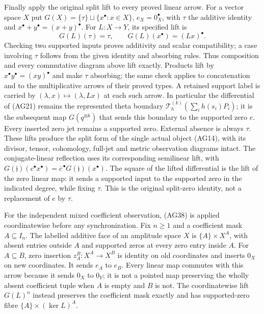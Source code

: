 Finally apply the original split lift to every proved linear arrow.
For a vector space $X$ put
$G(X)=\{\tau\}\sqcup\{x^\bullet:x\in X\}$,
$e_X=0_X^\bullet$, with $\tau$ the additive identity and
$x^\bullet+y^\bullet=(x+y)^\bullet$.
For $L:X\to Y$, its specified lift is
\[
 G(L)(\tau)=\tau,\qquad G(L)(x^\bullet)=(Lx)^\bullet.
 \tag{AG38}
\]
Checking two supported inputs proves additivity and scalar
compatibility; a case involving $\tau$ follows from the given
identity and absorbing rules.  Thus composition and every
commutative diagram above lift exactly.  Products lift by
$x^\bullet y^\bullet=(xy)^\bullet$ and make $\tau$ absorbing;
the same check applies to concatenation and to the multiplicative
arrows of their proved types.  A retained support label is carried
by $(\lambda,x)\mapsto(\lambda,Lx)$ at each such arrow.
In particular the differential of (AG21) remains the represented
theta boundary $\mathcal T_h^{(k)}(\sum_i h(s_i)P_i)$; it is
the subsequent map $G(q^{\otimes k})$ that sends this boundary
to the supported zero $e$.  Every inserted zero jet remains a
supported zero.  External
absence is always $\tau$.  These lifts produce the split form of
the single actual object (AG14), with its divisor, tensor,
cohomology, full-jet and metric observation diagrams intact.
The conjugate-linear reflection uses its corresponding semilinear
lift, with $G(\mathfrak j)(c^\bullet x^\bullet)
=\overline c^{\,\bullet}G(\mathfrak j)(x^\bullet)$.
The square of the lifted differential is the lift of the zero
linear map: it sends a supported input to the supported zero
in the indicated degree, while fixing $\tau$.  This is the
original split-zero identity, not a replacement of $e$ by $\tau$.

For the independent mixed coefficient observation, (AG38) is applied
coordinatewise before any synchronization. Fix $n\ge1$ and a coefficient
mask $A\subseteq I_n$. The labelled additive face of an amplitude space
$X$ is $\{A\}\times X^A$, with absent entries outside $A$ and supported
zeros at every zero entry inside $A$. For $A\subseteq B$, zero insertion
$z_A^B:X^A\to X^B$ is identity on old coordinates and inserts $0_X$
on new coordinates. It sends $e_A$ to $e_B$. Every linear map commutes
with this arrow because it sends $0_X$ to $0_Y$; it is not a pointed
map preserving the wholly absent coefficient tuple when $A$ is empty
and $B$ is not. The coordinatewise lift $G(L)^n$ instead preserves
the coefficient mask exactly and has supported-zero fibre
$\{A\}\times(\ker L)^A$.

